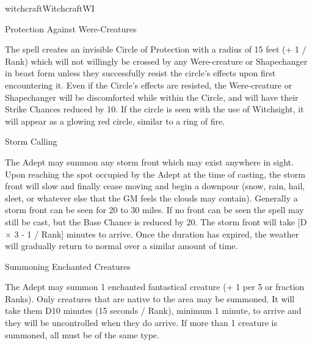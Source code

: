 \begin{College}[1.1]{witchcraft}{Witchcraft}{WI}
\begin{spell}[G-9]{Protection Against Were-Creatures}
\begin{effects}
The spell creates an invisible Circle of Protection with a radius of
15 feet (+ 1 / Rank) which will not willingly be crossed by any
Were-creature or Shapechanger in beast form unless they successfully
resist the circle’s effects upon first encountering it.  Even if the
Circle’s effects are resisted, the Were-creature or Shapechanger will
be discomforted while within the Circle, and will have their Strike
Chances reduced by 10.  If the circle is seen with the use of
Witchsight, it will appear as a glowing red circle, similar to a ring
of fire.
\end{effects}
\end{spell}

\begin{spell}[G-10]{Storm Calling}

\begin{effects}
The Adept may summon any storm front which may exist anywhere in
sight. Upon reaching the spot occupied by the Adept at the time of
casting, the storm front will slow and finally cease moving and begin
a downpour (snow, rain, hail, sleet, or whatever else that the GM
feels the clouds may contain).  Generally a storm front can be seen
for 20 to 30 miles. If no front can be seen the spell may still be
cast, but the Base Chance is reduced by 20. The storm front will take
[D × 3 - 1 / Rank] minutes to arrive.  Once the duration has expired,
the weather will gradually return to normal over a similar amount of
time.
\end{effects}
\end{spell}

\begin{spell}[G-11]{Summoning Enchanted Creatures}

\begin{effects}
The Adept may summon 1 enchanted fantastical creature (+ 1 per 5 or
fraction Ranks).  Only creatures that are native to the area may be
summoned.  It will take them D10 minutes (15 seconds / Rank), minimum
1 minute, to arrive and they will be uncontrolled when they do arrive.
If more than 1 creature is summoned, all must be of the same type.
\end{effects}
\end{spell}


\end{College}
